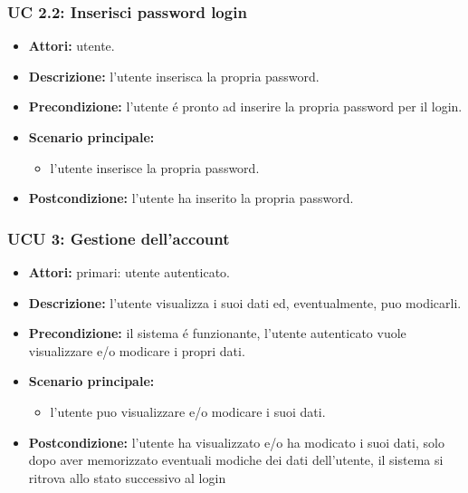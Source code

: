 \subsubsection{UC 2.2: Inserisci password login}
\begin{itemize}
\item \textbf{Attori: } utente.
\item \textbf{Descrizione: } l'utente inserisca la propria password.
\item \textbf{Precondizione:} l'utente é pronto ad inserire la propria password per il login.
\item \textbf{Scenario principale:}
\begin{itemize}
\item l'utente inserisce la propria password.
\end{itemize}
\item \textbf{Postcondizione:} l'utente ha inserito la propria password.
\end{itemize}

\subsubsection{UCU 3: Gestione dell'account} %
\begin{itemize}
	\item \textbf{Attori: } primari: utente autenticato.
	\item \textbf{Descrizione: } l'utente visualizza i suoi dati ed, eventualmente, puo modicarli.
	\item \textbf{Precondizione:} il sistema é funzionante, l'utente autenticato vuole visualizzare e/o modicare i propri dati.
	\item \textbf{Scenario principale:}
	\begin{itemize}
		\item l'utente puo visualizzare e/o modicare i suoi dati.
	\end{itemize}
	\item \textbf{Postcondizione:} l'utente ha visualizzato e/o ha modicato i suoi dati, solo dopo aver memorizzato eventuali modiche dei dati dell'utente, il sistema
si ritrova allo stato successivo al login 
\end{itemize}

